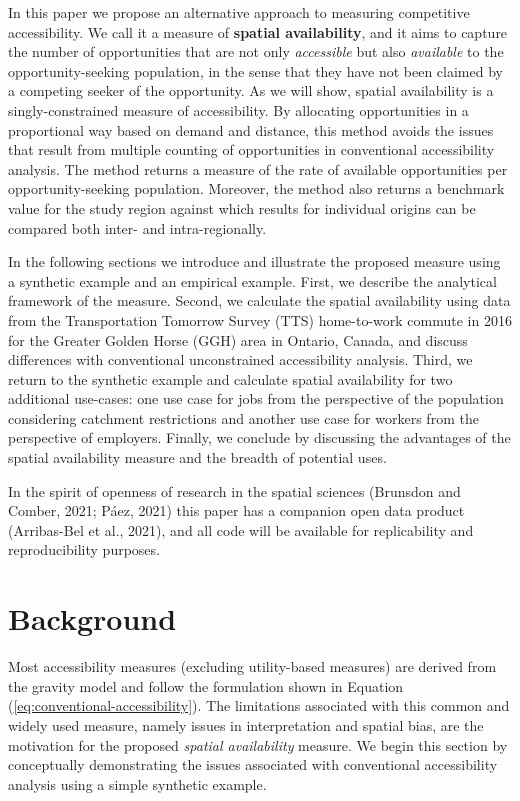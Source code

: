 \documentclass[]{elsarticle} %
\begin{document}
In this paper we propose an alternative approach to measuring
competitive accessibility. We call it a measure of \textbf{spatial
availability}, and it aims to capture the number of opportunities that
are not only \emph{accessible} but also \emph{available} to the
opportunity-seeking population, in the sense that they have not been
claimed by a competing seeker of the opportunity. As we will show,
spatial availability is a singly-constrained measure of accessibility.
By allocating opportunities in a proportional way based on demand and
distance, this method avoids the issues that result from multiple
counting of opportunities in conventional accessibility analysis. The
method returns a measure of the rate of available opportunities per
opportunity-seeking population. Moreover, the method also returns a
benchmark value for the study region against which results for
individual origins can be compared both inter- and intra-regionally.

In the following sections we introduce and illustrate the proposed
measure using a synthetic example and an empirical example. First, we
describe the analytical framework of the measure. Second, we calculate
the spatial availability using data from the Transportation Tomorrow
Survey (TTS) home-to-work commute in 2016 for the Greater Golden Horse
(GGH) area in Ontario, Canada, and discuss differences with conventional
unconstrained accessibility analysis. Third, we return to the synthetic
example and calculate spatial availability for two additional use-cases:
one use case for jobs from the perspective of the population considering
catchment restrictions and another use case for workers from the
perspective of employers. Finally, we conclude by discussing the
advantages of the spatial availability measure and the breadth of
potential uses.

In the spirit of openness of research in the spatial sciences (Brunsdon
and Comber, 2021; Páez, 2021) this paper has a companion open data
product (Arribas-Bel et al., 2021), and all code will be available for
replicability and reproducibility purposes.

\hypertarget{background}{%
\section{Background}\label{background}}

Most accessibility measures (excluding utility-based measures) are
derived from the gravity model and follow the formulation shown in
Equation (\ref{eq:conventional-accessibility}). The limitations
associated with this common and widely used measure, namely issues in
interpretation and spatial bias, are the motivation for the proposed
\emph{spatial availability} measure. We begin this section by
conceptually demonstrating the issues associated with conventional
accessibility analysis using a simple synthetic example.
\end{document}
